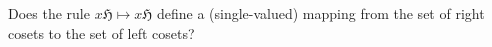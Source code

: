 Does the rule $x\mathfrak{H} \mapsto x\mathfrak{H}$ define a (single-valued) mapping from the set of right cosets to the set of left cosets?
